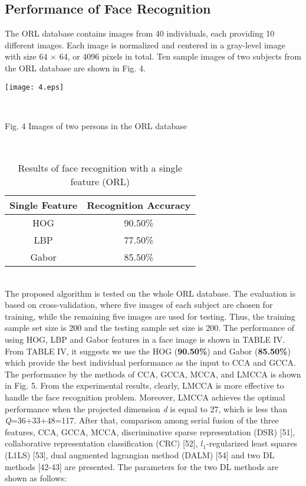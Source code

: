 \documentclass[journal]{IEEEtran}
\begin{document}
\subsection{Performance of Face Recognition}
The ORL database contains images from 40 individuals, each providing 10 different images. Each image is normalized and centered in a gray-level image with size 64 $\times$ 64, or 4096 pixels in total. Ten sample images of two subjects from the ORL database are shown in Fig. 4.\\
\centerline {\texttt{[image: 4.eps]}}\\  \centerline {Fig. 4 Images of two persons in the ORL database}\\\indent
\vspace*{-10pt}
\begin{table}[h]
\small
\renewcommand{\arraystretch}{1.3}
\caption{\normalsize{Results of face recognition with a single feature (ORL)}}
\setlength{\abovecaptionskip}{0pt}
\setlength{\belowcaptionskip}{10pt}
\centering
\tabcolsep 0.07in
\begin{tabular}{cc}
\hline
Single Feature & Recognition Accuracy\\
\hline
 HOG  &90.50\%\\
 LBP  &77.50\%\\
 Gabor &85.50\%\\
\hline
\end{tabular}
\end{table}\\\indent
The proposed algorithm is tested on the whole ORL database. The evaluation is based on cross-validation, where five images of each subject are chosen for training, while the remaining five images are used for testing. Thus, the training sample set size is 200 and the testing sample set size is 200. The performance of using HOG, LBP and Gabor features in a face image is shown in TABLE IV. From TABLE IV, it suggests we use the HOG (\textbf{90.50\%}) and Gabor (\textbf{85.50\%}) which provide the best individual performance as the input to CCA and GCCA.\\\indent %
The performance by the methods of CCA, GCCA, MCCA, and LMCCA is shown in Fig. 5. From the experimental results, clearly, LMCCA is more effective to handle the face recognition problem. Moreover, LMCCA achieves the optimal performance when the projected dimension \emph{d} is equal to 27, which is less than \emph{Q}=36+33+48=117. After that, comparison among serial fusion of the three features, CCA, GCCA, MCCA, discriminative sparse representation (DSR) [51], collaborative representation classification (CRC) [52], \emph{$l_1$}-regularized least squares (L1LS) [53], dual augmented lagrangian method (DALM) [54] and two DL methods [42-43] are presented. The parameters for the two DL methods are shown as follows:\\
\end{document}
